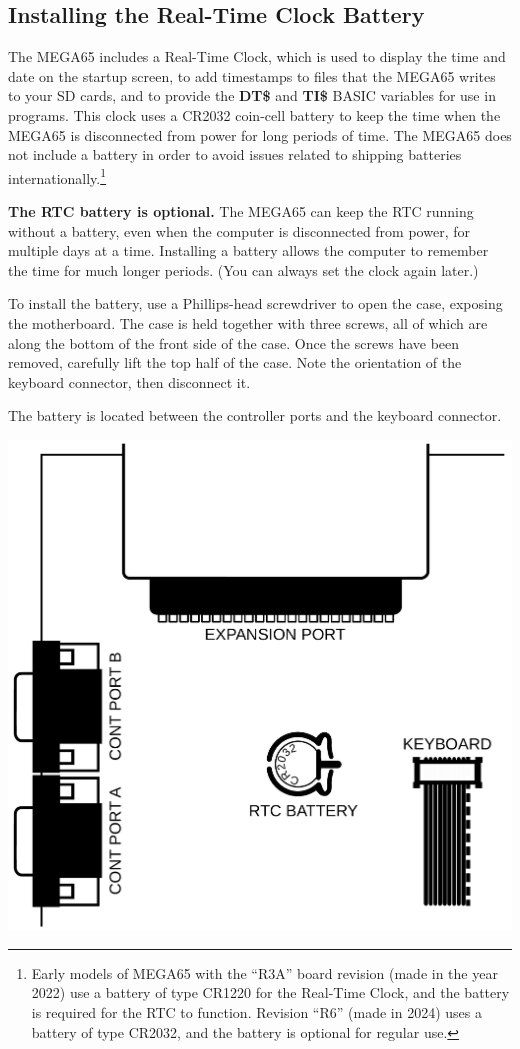 \subsection{Installing the Real-Time Clock Battery}

The MEGA65 includes a Real-Time Clock, which is used to display the time and date on the startup screen, to add timestamps to files that the MEGA65 writes to your SD cards, and to provide the {\bf DT\$} and {\bf TI\$} BASIC variables for use in programs. This clock uses a CR2032 coin-cell battery to keep the time when the MEGA65 is disconnected from power for long periods of time. The MEGA65 does not include a battery in order to avoid issues related to shipping batteries internationally.\footnote{Early models of MEGA65 with the ``R3A'' board revision (made in the year 2022) use a battery of type CR1220 for the Real-Time Clock, and the battery is required for the RTC to function. Revision ``R6'' (made in 2024) uses a battery of type CR2032, and the battery is optional for regular use.}

{\bf The RTC battery is optional.} The MEGA65 can keep the RTC running without a battery, even when the computer is disconnected from power, for multiple days at a time. Installing a battery allows the computer to remember the time for much longer periods. (You can always set the clock again later.)

To install the battery, use a Phillips-head screwdriver to open the case, exposing the motherboard. The case is held together with three screws, all of which are along the bottom of the front side of the case. Once the screws have been removed, carefully lift the top half of the case. Note the orientation of the keyboard connector, then disconnect it.

The battery is located between the controller ports and the keyboard connector.

\includegraphics[width=\linewidth]{images/illustrations/rtc-battery-location.pdf}

